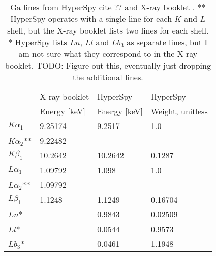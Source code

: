 
\begin{table}[tbp]
    \centering
    \begin{tabular}{llll}
                       & X-ray booklet & HyperSpy     & HyperSpy         \\
                       & Energy [keV]  & Energy [keV] & Weight, unitless \\
        \hline
        $K \alpha_1$   & 9.25174       & 9.2517       & 1.0              \\
        $K \alpha_2$** & 9.22482       &              &                  \\
        $K \beta_1$    & 10.2642       & 10.2642      & 0.1287           \\
        $L \alpha_1$   & 1.09792       & 1.098        & 1.0              \\
        $L \alpha_2$** & 1.09792       &              &                  \\
        $L \beta_1$    & 1.1248        & 1.1249       & 0.16704          \\
        $Ln$*          &               & 0.9843       & 0.02509          \\
        $Ll$*          &               & 0.0544       & 0.9573           \\
        $Lb_3$*        &               & 0.0461       & 1.1948
    \end{tabular}
    \caption{
        Ga lines from HyperSpy cite ?? and X-ray booklet \cite{thompson_x-ray_2004}.
        ** HyperSpy operates with a single line for each $K$ and $L$ shell, but the X-ray booklet lists two lines for each shell.
        * HyperSpy lists $Ln$, $Ll$ and $Lb_3$ as separate lines, but I am not sure what they correspond to in the X-ray booklet.
        TODO: Figure out this, eventually just dropping the additional lines.}
    \label{tab:theory:Ga-lines}

\end{table}